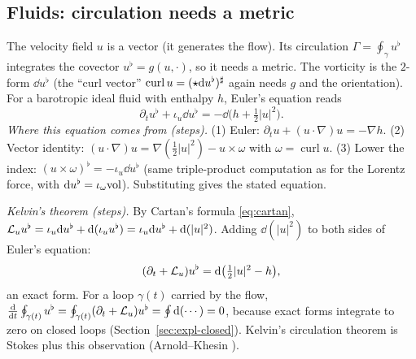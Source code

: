 \subsection{Fluids: circulation needs a metric}\label{sec:phys-fluids}

The velocity field $u$ is a vector (it generates the flow). Its circulation $\Gamma=\oint_\gamma u^\flat$ integrates the covector $u^\flat=g(u,\cdot)$, so it needs a metric. The vorticity is the $2$-form $\dd u^\flat$ (the ``curl vector'' $\operatorname{curl}u=(\star\mathrm{d} u^\flat)^\sharp$ again needs $g$ and the orientation). For a barotropic ideal fluid with enthalpy $h$, Euler's equation reads
\begin{equation}\label{eq:euler}
\partial_tu^\flat+\iota_u\dd u^\flat=-\dd\bigl(h+\tfrac12|u|^2\bigr).
\end{equation}
\emph{Where this equation comes from (steps).} (1) Euler: $\partial_tu+(u\cdot\nabla)u=-\nabla h$. (2) Vector identity: $(u\cdot\nabla)u=\nabla(\frac12|u|^2)-u\times\omega$ with $\omega=\operatorname{curl}u$. (3) Lower the index: $(u\times\omega)^\flat=-\iota_u\dd u^\flat$ (same triple-product computation as for the Lorentz force, with $\mathrm{d} u^\flat=\iota_\omega\mathrm{vol}$). Substituting gives the stated equation.

\emph{Kelvin's theorem (steps).} By Cartan's formula \eqref{eq:cartan}, $\mathcal{L}_uu^\flat=\iota_u\mathrm{d} u^\flat+\mathrm{d}(\iota_uu^\flat)=\iota_u\mathrm{d} u^\flat+\mathrm{d}(|u|^2)$. Adding $\dd(|u|^2)$ to both sides of Euler's equation:
\[
(\partial_t+\mathcal{L}_u)u^\flat=\mathrm{d}\bigl(\tfrac12|u|^2-h\bigr),
\]
an exact form. For a loop $\gamma(t)$ carried by the flow, $\frac{\mathrm{d}}{\mathrm{d} t}\oint_{\gamma(t)}u^\flat=\oint_{\gamma(t)}(\partial_t+\mathcal{L}_u)u^\flat=\oint\mathrm{d}(\cdots)=0$, because exact forms integrate to zero on closed loops (Section~\ref{sec:expl-closed}). Kelvin's circulation theorem is Stokes plus this observation (Arnold--Khesin \cite{ArnoldKhesin}).
